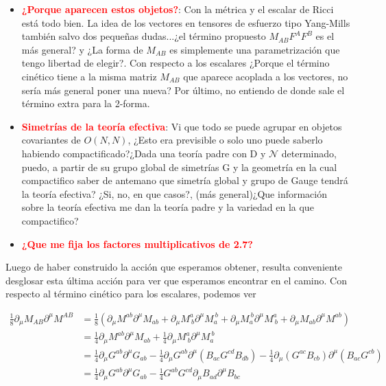 \documentclass{article}
\numberwithin{equation}{section}
\begin{document}
\begin{itemize}
	\item \textcolor{red}{\textbf{¿Porque aparecen estos objetos?}}: Con la métrica y el escalar de Ricci está todo bien. La idea de los vectores en tensores de esfuerzo tipo Yang-Mills también salvo dos pequeñas dudas...¿el término propuesto $ M_{A B} F^{A} F^{B} $ es el más general? y ¿La forma de $ M_{A B} $ es simplemente una parametrización que tengo libertad de elegir?. 
	Con respecto a los escalares ¿Porque el término cinético tiene a la misma matriz $ M_{A B} $ que aparece acoplada a los vectores, no sería más general poner una nueva? 
	Por último, no entiendo de donde sale el término extra para la 2-forma.
	\item \textcolor{red}{\textbf{Simetrías de la teoría efectiva}}: Vi que todo se puede agrupar en objetos covariantes de $ O(N,N) $, ¿Esto era previsible o solo uno puede saberlo habiendo compactificado?¿Dada una teoría padre con D y $ \mathcal{N} $ determinado, puedo, a partir de su grupo global de simetrías G y la geometría en la cual compactifico saber de antemano que simetría global y grupo de Gauge tendrá la teoría efectiva? ¿Si, no, en que casos?, (más general)¿Que información sobre la teoría efectiva me dan la teoría padre y la variedad en la que compactifico?
	\item \textcolor{red}{\textbf{¿Que me fija los factores multiplicativos de 2.7?}}
\end{itemize}

Luego de haber construido la acción que esperamos obtener, resulta conveniente desglosar esta última acción para ver que esperamos encontrar en el camino. Con respecto al término cinético para los escalares, podemos ver


\begin{equation} \label{DMDM}
\begin{aligned}
\frac{1}{8}\partial_{\mu} M_{A B} \partial^{\mu} M^{A B} &= \frac{1}{8} \left( \partial_{\mu} M^{a b} \partial^{\mu} M_{a b}  + \partial_{\mu} M^a_{\ b} \partial^{\mu} M_a^{\ b} + \partial_{\mu} M_a^{\ b} \partial^{\mu} M^a_{\ b} + \partial_{\mu} M_{a b} \partial^{\mu} M^{a b} \right)\\
&= \frac{1}{4} \partial_{\mu} M^{a b} \partial^{\mu} M_{a b} + \frac{1}{4} \partial_{\mu} M^a_{\ b} \partial^{\mu} M_a^{\ b}\\
&= \frac{1}{4} \partial_{\mu} G^{a b}\partial^{\mu} G_{a b} - \frac{1}{4}\partial_{\mu} G^{a b} \partial^{\mu} \left(B_{a c} G^{c d} B_{d b} \right) - \frac{1}{4} \partial_{\mu} \left(G^{a c} B_{c b}\right) \partial^{\mu} \left( B_{a c} G^{c b}\right)\\
&= \frac{1}{4} \partial_{\mu} G^{a b}\partial^{\mu} G_{a b} - \frac{1}{4} G^{a b} G^{c d} \partial_{\mu} B_{a d} \partial^{\mu} B_{b c}
\end{aligned}
\end{equation}
\end{document}

